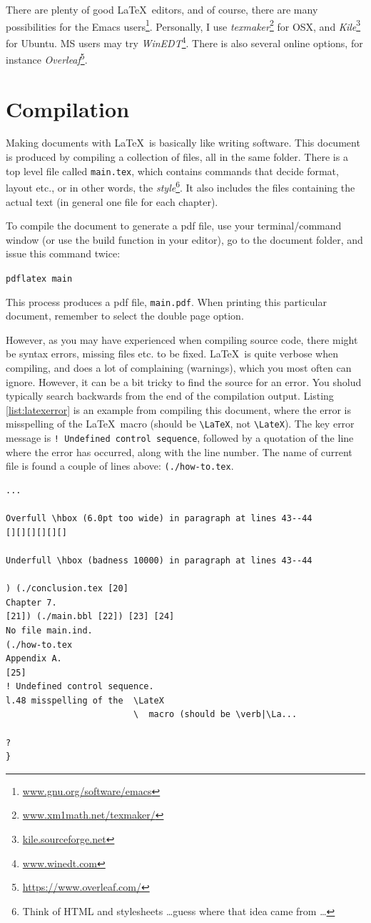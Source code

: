 There are plenty of good \LaTeX\ editors, and of course, there are many possibilities for the Emacs users\footnote{\url{www.gnu.org/software/emacs}}. Personally, I use {\em texmaker}\footnote{\url{www.xm1math.net/texmaker/}}
for OSX, and 
{\em Kile}\footnote{\url{kile.sourceforge.net}}
for Ubuntu. MS users may try {\em WinEDT}\footnote{\url{www.winedt.com}}. There is also several online options, for instance {\em Overleaf}\footnote{\url{https://www.overleaf.com/}}.

\section{Compilation}

Making documents with \LaTeX\ is basically like writing software. 
This document is produced by compiling a collection of files, all in the same folder.
There is a top level file called 
{\tt main.tex}, which contains commands that decide format, layout etc., or in other words, the {\em style}\footnote{Think of HTML and stylesheets \dots guess where that idea came from \dots}. It also includes the files containing the actual text (in general one file for each chapter).

To compile the document to generate a pdf file, use your terminal/command window (or use the build function in your editor), go to the document folder, and issue this command twice: 

\verb|pdflatex main|

This process produces a  pdf file,
{\tt main.pdf}. When printing this particular document, remember to select the double page option.

However, as you may have experienced when compiling source code, there might be syntax errors, missing files etc. to be fixed. \LaTeX\  is quite verbose when compiling, and does a lot of complaining (warnings), which you most often can ignore. However, it can be a bit tricky to find the source for an error. You sholud typically search backwards from the end of the compilation output. Listing \ref{list:latexerror} is an example from compiling this document, where the error is 
misspelling of the \LaTeX\  macro (should be \verb|\LaTeX|, not \verb|\LateX|). The key error message is \verb|! Undefined control sequence|, followed by a quotation of the line where the error has occurred, along with the line number. The name of current file is found a couple of lines above: \verb|(./how-to.tex|.

\begin{lstlisting}[float=htpb, caption=\LaTeX\ error output,label=list:latexerror]
...

Overfull \hbox (6.0pt too wide) in paragraph at lines 43--44
[][][][][][]

Underfull \hbox (badness 10000) in paragraph at lines 43--44

) (./conclusion.tex [20]
Chapter 7.
[21]) (./main.bbl [22]) [23] [24]
No file main.ind.
(./how-to.tex
Appendix A.
[25]
! Undefined control sequence.
l.48 misspelling of the  \LateX
                         \  macro (should be \verb|\La...

? 
} 
\end{lstlisting} 

